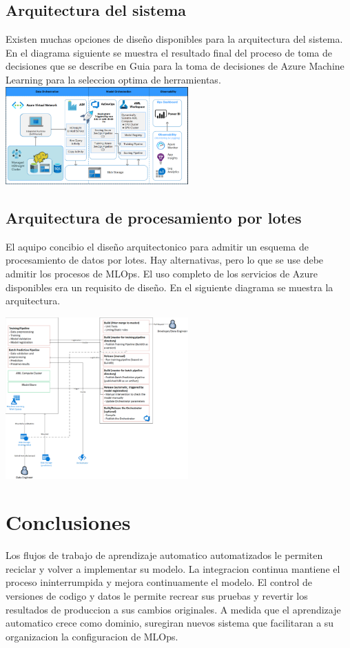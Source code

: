 \documentclass[twoside,twocolumn]{article}
\begin{document}
\subsection{Arquitectura del sistema}
Existen muchas opciones de diseño disponibles para la arquitectura del sistema.
En el diagrama siguiente se muestra el resultado final del proceso de toma de decisiones que se describe en Guia para la toma de decisiones de Azure Machine Learning para la seleccion optima de herramientas.
\includegraphics[width=7cm]{imagenes/imagen3.png}

\subsection{Arquitectura de procesamiento por lotes}

El aquipo concibio el diseño arquitectonico para admitir un esquema de procesamiento de datos por lotes. Hay alternativas, pero lo que se use debe admitir los procesos de MLOps. El uso completo de los servicios de Azure
disponibles era un requisito de diseño. En el siguiente diagrama se muestra la arquitectura.


\includegraphics[width=7cm]{imagenes/imagen4.png}


\section{Conclusiones}

Los flujos de trabajo de aprendizaje automatico automatizados le permiten reciclar y volver a implementar su modelo.
La integracion continua mantiene el proceso ininterrumpida y mejora continuamente el modelo.
El control de versiones de codigo y datos le permite recrear sus pruebas  y revertir los resultados de produccion a sus cambios originales.
A medida que el aprendizaje automatico crece como dominio, suregiran nuevos sistema que facilitaran a su organizacion la configuracion de MLOps. 
\end{document}
